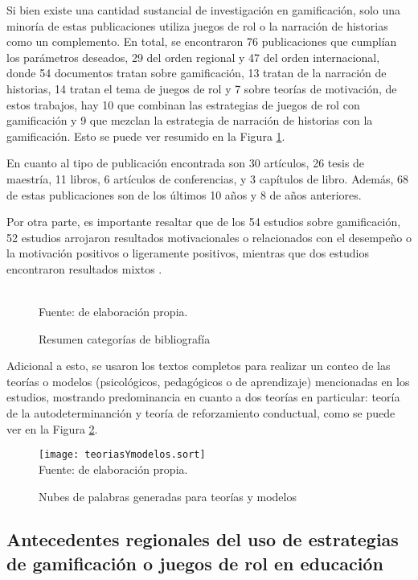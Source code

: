 Si bien existe una cantidad sustancial de investigación en gamificación, solo una minoría de estas 
publicaciones utiliza juegos de rol o la narración de historias como un complemento. En total, se encontraron
76 publicaciones que cumplían los parámetros deseados, 29 del orden regional y 47 del orden internacional, 
donde 54 documentos tratan sobre gamificación, 13 tratan de la narración de historias, 14 tratan el tema de 
juegos de rol y 7 sobre teorías de motivación, de estos trabajos, hay 10 que combinan las estrategias de 
juegos de rol con gamificación y 9 que mezclan la estrategia de narración de historias con la gamificación. 
Esto se puede ver resumido en la Figura \ref{img:catbib}.

En cuanto al tipo de publicación encontrada son 30 artículos, 26 tesis de maestría, 11 libros, 6 artículos de 
conferencias, y 3 capítulos de libro. Además, 68 de estas publicaciones son de los últimos 10 años y 8 de años 
anteriores.

Por otra parte, es importante resaltar que de los 54 estudios sobre gamificación, 52 estudios arrojaron 
resultados motivacionales o relacionados con el desempeño o la motivación positivos o ligeramente positivos, 
mientras que dos estudios encontraron resultados mixtos \cite{DING20191, PRESTOPNIK2015492}.

\begin{figure}[ht]
\caption{Resumen categorías de bibliografía}
\label{img:catbib}
\centering

\\
{\footnotesize Fuente: de elaboración propia.}
\end{figure}

\pagebreak

Adicional a esto, se usaron los textos completos para realizar un conteo de las teorías o modelos 
(psicológicos, pedagógicos o de aprendizaje) mencionadas en los estudios, mostrando predominancia en cuanto a 
dos teorías en particular: teoría de la autodeterminanción y teoría de reforzamiento conductual, 
como se puede ver en la Figura \ref{img:nubeteorias}.

\begin{figure}[H]
  \caption{Nubes de palabras generadas para teorías y modelos}
  \label{img:nubeteorias}
  \centering
  \texttt{[image: teoriasYmodelos.sort]}
  \\
  {\footnotesize Fuente: de elaboración propia.}
\end{figure}

\subsection{Antecedentes regionales del uso de estrategias de gamificación o juegos de rol en educación}

